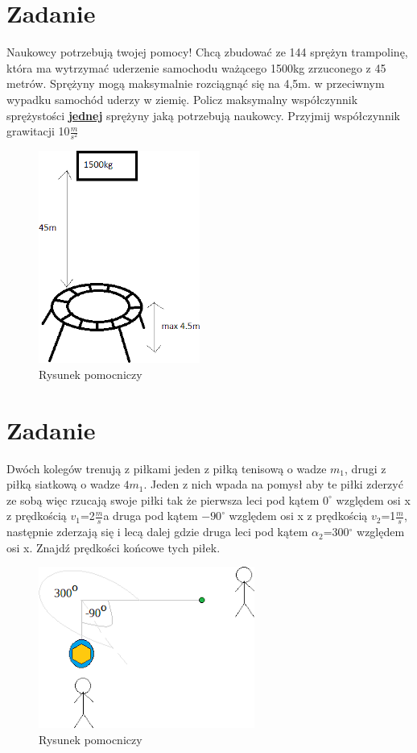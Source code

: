 \documentclass[14pt]{extarticle}
\begin{document}
    \section{Zadanie}
    \begin{flushleft}
        Naukowcy potrzebują twojej pomocy! Chcą zbudować ze 144 sprężyn trampolinę, która ma wytrzymać uderzenie samochodu ważącego 1500kg zrzuconego z 45 metrów.
        Sprężyny mogą maksymalnie rozciągnąć się na 4,5m. w przeciwnym wypadku samochód uderzy w ziemię.
        Policz maksymalny współczynnik sprężystości \textbf{\underline{jednej}} sprężyny jaką potrzebują naukowcy.
        Przyjmij współczynnik grawitacji 10$\frac{m}{s^2}$
    \end{flushleft}
    \begin{figure}[H]
        \centering
        \includegraphics{trampolina}
        \caption{Rysunek pomocniczy}
    \end{figure}
    \clearpage
    \section{Zadanie}
    \begin{flushleft}
        Dwóch kolegów trenują z piłkami jeden z piłką tenisową o wadze $m_1$, drugi z piłką siatkową o wadze $4m_1$. Jeden z nich wpada na pomysł aby te piłki zderzyć ze sobą więc rzucają swoje piłki tak że
        pierwsza leci pod kątem $0^\circ$ względem osi x z prędkością $v_1$=2$\frac{m}{s}$a druga pod kątem $-90^\circ$ względem osi x z prędkością $v_2$=1$\frac{m}{s}$,
        następnie zderzają się i lecą dalej gdzie druga leci pod kątem $\alpha _2$=300$^\circ$ względem osi x.
        Znajdź prędkości końcowe tych piłek.
    \end{flushleft}
    \begin{figure}[H]
        \centering
        \includegraphics{pilki2}
        \caption{Rysunek pomocniczy}
    \end{figure}
    \clearpage
\end{document}
